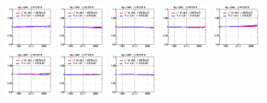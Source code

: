 \begin{figure}[!htbp]
{{\includegraphics[width=0.16\textwidth]{fig/spectra__pdf41_BB18_ADDGRW.png}
\includegraphics[width=0.16\textwidth]{fig/spectra__pdf42_BB18_ADDGRW.png}
\includegraphics[width=0.16\textwidth]{fig/spectra__pdf43_BB18_ADDGRW.png}
\includegraphics[width=0.16\textwidth]{fig/spectra__pdf44_BB18_ADDGRW.png}
\includegraphics[width=0.16\textwidth]{fig/spectra__pdf45_BB18_ADDGRW.png}\\
\includegraphics[width=0.16\textwidth]{fig/spectra__pdf46_BB18_ADDGRW.png}
\includegraphics[width=0.16\textwidth]{fig/spectra__pdf47_BB18_ADDGRW.png}
\includegraphics[width=0.16\textwidth]{fig/spectra__pdf48_BB18_ADDGRW.png}
}}
\end{figure}
